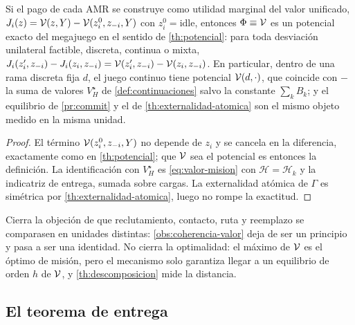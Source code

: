 \begin{teorema}
\label{th:potencial-valor}
Si el pago de cada AMR se construye como utilidad marginal del valor
unificado, $J_i(z)=\mathcal{V}(z,Y)-\mathcal{V}(z_i^{0},z_{-i},Y)$ con
$z_i^{0}=\mathrm{idle}$, entonces $\Phi\equiv\mathcal{V}$ es un potencial exacto del
megajuego en el sentido de \cref{th:potencial}: para toda desviación
unilateral factible, discreta, continua o mixta,
$J_i(z_i',z_{-i})-J_i(z_i,z_{-i})=\mathcal{V}(z_i',z_{-i})-\mathcal{V}(z_i,z_{-i})$. En
particular, dentro de una rama discreta fija $d$, el juego continuo tiene
potencial $\mathcal{V}(d,\cdot)$, que coincide con $-$ la suma de valores
$V_H^\star$ de \cref{def:continuaciones} salvo la constante $\sum_kB_k$; y el
equilibrio de \cref{pr:commit} y el de \cref{th:externalidad-atomica} son el
mismo objeto medido en la misma unidad.
\end{teorema}

\begin{proof}
El término $\mathcal{V}(z_i^0,z_{-i},Y)$ no depende de $z_i$ y se cancela en la
diferencia, exactamente como en \cref{th:potencial}; que $\mathcal{V}$ sea el
potencial es entonces la definición. La identificación con $V_H^\star$ es
\eqref{eq:valor-mision} con $\mathcal H=\mathcal H_k$ y la indicatriz de
entrega, sumada sobre cargas. La externalidad atómica de $\Gamma$ es
simétrica por \cref{th:externalidad-atomica}, luego no rompe la exactitud.
\end{proof}

\begin{observacion}
\label{obs:potencial-valor-alcance}
Cierra la objeción de que reclutamiento, contacto, ruta y reemplazo se
comparasen en unidades distintas: \cref{obs:coherencia-valor} deja de ser un
principio y pasa a ser una identidad. No cierra la optimalidad: el máximo de
$\mathcal{V}$ es el óptimo de misión, pero el mecanismo solo garantiza llegar a un
equilibrio de orden $h$ de $\mathcal{V}$, y \cref{th:descomposicion} mide la
distancia.
\end{observacion}

\subsection{El teorema de entrega}

